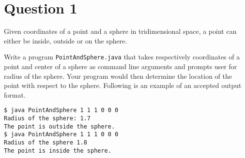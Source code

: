 %
%
%
%

\section*{Question 1}
Given coordinates of a point and a sphere in tridimensional space, a point can either be inside, outside or on the sphere.

Write a program \texttt{PointAndSphere.java} that takes respectively coordinates of a point and center of a sphere as command line arguments and prompts user for radius of the sphere.
Your program would then determine the location of the point with respect to the sphere.
Following is an example of an accepted output format.

\begin{verbatim}
$ java PointAndSphere 1 1 1 0 0 0
Radius of the sphere: 1.7
The point is outside the sphere.
$ java PointAndSphere 1 1 1 0 0 0
Radius of the sphere 1.8
The point is inside the sphere.
\end{verbatim}

